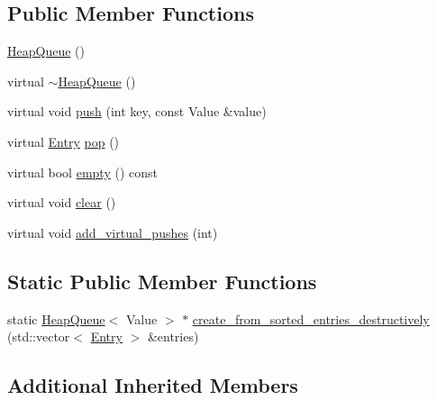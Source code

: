 \subsection*{Public Member Functions}
\begin{DoxyCompactItemize}
\item 
\hyperlink{classHeapQueue_a010ced01934038371fcd20e3d52f39c2}{Heap\-Queue} ()
\item 
virtual \hyperlink{classHeapQueue_a6887004ad24c03778c0a833f04d1b79b}{$\sim$\-Heap\-Queue} ()
\item 
virtual void \hyperlink{classHeapQueue_a59850c8362a38865ee21b3db3d71f9e4}{push} (int key, const Value \&value)
\item 
virtual \hyperlink{classAbstractQueue_abe60381528bc4cf9d4032f33f2ff6f3c}{Entry} \hyperlink{classHeapQueue_a6fcbe11f528e5ae359ae780c671d7125}{pop} ()
\item 
virtual bool \hyperlink{classHeapQueue_a521d3e13a491f221947eee52a6ddfc0b}{empty} () const 
\item 
virtual void \hyperlink{classHeapQueue_af58d2cdb07e463b1d99013caf828df83}{clear} ()
\item 
virtual void \hyperlink{classHeapQueue_ad3d89c1e3f76c64ea10630bf5468c86f}{add\-\_\-virtual\-\_\-pushes} (int)
\end{DoxyCompactItemize}
\subsection*{Static Public Member Functions}
\begin{DoxyCompactItemize}
\item 
static \hyperlink{classHeapQueue}{Heap\-Queue}$<$ Value $>$ $\ast$ \hyperlink{classHeapQueue_a6647b3c52cc0dcf752cbc953b22ea030}{create\-\_\-from\-\_\-sorted\-\_\-entries\-\_\-destructively} (std\-::vector$<$ \hyperlink{classAbstractQueue_abe60381528bc4cf9d4032f33f2ff6f3c}{Entry} $>$ \&entries)
\end{DoxyCompactItemize}
\subsection*{Additional Inherited Members}


